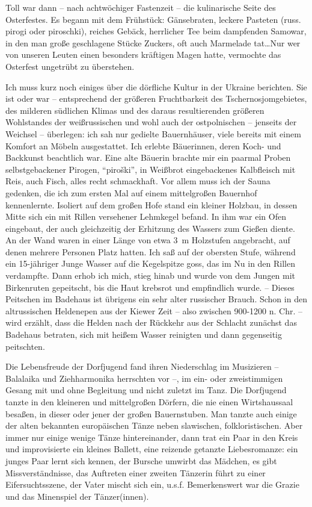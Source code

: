 \documentclass[a5paper,pagesize,10pt,twoside=true]{scrbook}
\renewcommand{\marginpar}[2][]{}
\begin{document}
Toll war dann -- nach achtwöchiger Fastenzeit -- die kulinarische Seite des Osterfestes. Es begann mit dem Frühstück: Gänsebraten, leckere Pasteten (russ. pirogi oder piroschki), reiches Gebäck, herrlicher Tee beim dampfenden Samowar, in den man große geschlagene Stücke Zuckers, oft auch Marmelade tat\dots Nur wer von unseren Leuten einen besonders kräftigen Magen hatte, vermochte das Osterfest ungetrübt zu überstehen.

\marginpar{363}
Ich muss kurz noch einiges über die dörfliche Kultur in der Ukraine berichten. Sie ist oder war -- entsprechend der größeren Fruchtbarkeit des Tschernosjomgebietes, des milderen südlichen Klimas und des daraus resultierenden größeren Wohlstandes der weißrussischen und wohl auch der ostpolnischen -- jenseits der Weichsel -- überlegen: ich sah nur gedielte Bauernhäuser, viele bereits mit einem Komfort an Möbeln ausgestattet. Ich erlebte Bäuerinnen, deren Koch- und Backkunst beachtlich war. Eine alte Bäuerin brachte mir ein paarmal Proben selbstgebackener Pirogen, \enquote{piroški}, in Weißbrot eingebackenes Kalbfleisch mit Reis, auch Fisch, alles recht schmackhaft. Vor allem muss ich der Sauna gedenken, die ich zum ersten Mal auf einem mittelgroßen Bauernhof kennenlernte. Isoliert auf dem großen Hofe stand ein kleiner Holzbau, in dessen Mitte sich ein mit Rillen versehener Lehmkegel befand. In ihm war ein Ofen eingebaut, der auch gleichzeitig der Erhitzung des Wassers zum Gießen diente. An der Wand waren in einer Länge von etwa 3~m Holzstufen angebracht, auf denen mehrere Personen Platz hatten. Ich saß auf der obersten Stufe, während ein 15-jähriger Junge Wasser auf die Kegelspitze goss, das im Nu in den Rillen verdampfte. Dann erhob ich mich, stieg hinab und wurde von dem Jungen mit Birkenruten gepeitscht, bis die Haut krebsrot und empfindlich wurde. -- Dieses Peitschen im Badehaus ist übrigens ein sehr alter russischer Brauch. Schon in den altrussischen Heldenepen aus der Kiewer Zeit -- also zwischen 900-1200 n. Chr. -- wird erzählt, dass die Helden nach der Rückkehr aus der Schlacht zunächst das Badehaus betraten, sich mit heißem Wasser reinigten und dann gegenseitig peitschten.

Die Lebensfreude der Dorfjugend fand ihren Niederschlag im Musizieren -- Balalaika und Ziehharmonika herrschten vor --, im ein- oder zweistimmigen Gesang mit und ohne Begleitung und nicht zuletzt im Tanz. Die Dorfjugend tanzte in den kleineren und mittelgroßen Dörfern, die nie einen Wirtshaussaal besaßen, in dieser oder jener der großen Bauernstuben. Man tanzte auch einige der alten bekannten europäischen Tänze neben slawischen, folkloristischen. Aber immer nur einige wenige Tänze hintereinander, dann trat ein Paar in den Kreis und improvisierte ein kleines Ballett, eine reizende getanzte Liebesromanze: ein junges Paar lernt sich kennen, der Bursche umwirbt das Mädchen, es gibt Missverständnisse, das Auftreten einer zweiten Tänzerin führt zu einer Eifersuchtsszene, der Vater mischt sich ein, u.s.f. Bemerkenswert war die Grazie und das Minenspiel der Tänzer(innen).
\end{document}
